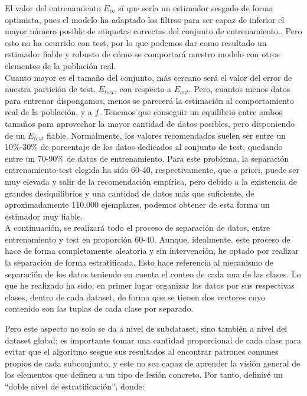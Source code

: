 El valor del entrenamiento $E_{in}$ sí que sería un estimador sesgado de forma optimista, pues el modelo ha adaptado los filtros para ser capaz de inferior el mayor número posible de etiquetas correctas del conjunto de entrenamiento.. Pero esto no ha ocurrido con test, por lo que podemos dar como resultado un estimador fiable y robusto de cómo se comportará nuestro modelo con otros elementos de la población real.\\

Cuanto mayor es el tamaño del conjunto, más cercano será el valor del error de nuestra partición de test, $E_{test}$, con respecto a $E_{out}$. Pero, cuantos menos datos para entrenar dispongamos, menos se parecerá la estimación al comportamiento real de la población, y a $f$. Tenemos que conseguir un equilibrio entre ambos tamaños para aprovechar la mayor cantidad de datos posibles, pero disponiendo de un $E_{test}$ fiable. Normalmente, los valores recomendados suelen ser entre un 10\%-30\% de porcentaje de los datos dedicados al conjunto de test, quedando entre un 70-90\% de datos de entrenamiento. Para este problema, la separación entrenamiento-test elegida ha sido 60-40, respectivamente, que a priori, puede ser muy elevada y salir de la recomendación empírica, pero debido a la existencia de grandes desiquilibrios y una cantidad de datos más que suficiente, de aproximadamente 110.000 ejemplares, podemos obtener de esta forma un estimador muy fiable.\\

A continuación, se realizará todo el proceso de separación de datos, entre entrenamiento y test en proporción 60-40. Aunque, idealmente, este proceso de hace de forma completamente aleatoria y sin intervención, he optado por realizar la separación de forma estratificada. Esto hace referencia al mecanismo de separación de los datos teniendo en cuenta el conteo de cada una de las clases. Lo que he realizado ha sido, en primer lugar organizar los datos por sus respectivas clases, dentro de cada dataset, de forma que se tienen dos vectores cuyo contenido son las tuplas de cada clase por separado. 

Pero este aspecto no solo se da a nivel de subdataset, sino también a nivel del dataset global; es importante tomar una cantidad proporcional de cada clase para evitar que el algoritmo sesgue sus resultados al encontrar patrones comunes propios de cada subconjunto, y este no sea capaz de aprender la visión general de los elementos que definen a un tipo de lesión concreto. Por tanto, definiré un ``doble nivel de estratificación'', donde:

